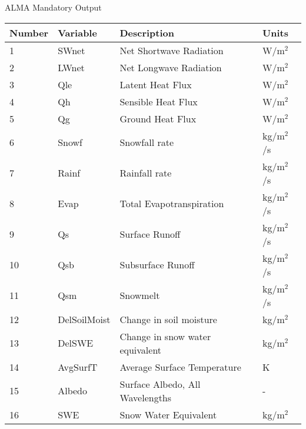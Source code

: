 
\setlength{\extrarowheight}{4pt}

\begin{verbatim}

\end{verbatim}

ALMA Mandatory Output

\begin{tabular}{|l|l|l|l|} \hline \label{table:noah_alma_out}
Number & Variable & Description                     & Units         \\ \hline
1  & SWnet        & Net Shortwave Radiation         & W/m$^2$       \\ \hline
2  & LWnet        & Net Longwave Radiation          & W/m$^2$       \\ \hline
3  & Qle          & Latent Heat Flux                & W/m$^2$       \\ \hline
4  & Qh           & Sensible Heat Flux              & W/m$^2$       \\ \hline
5  & Qg           & Ground Heat Flux                & W/m$^2$       \\ \hline
6  & Snowf        & Snowfall rate                   & kg/m$^2$/s    \\ \hline
7  & Rainf        & Rainfall rate                   & kg/m$^2$/s    \\ \hline
8  & Evap         & Total Evapotranspiration        & kg/m$^2$/s    \\ \hline
9  & Qs           & Surface Runoff                  & kg/m$^2$/s    \\ \hline
10 & Qsb          & Subsurface Runoff               & kg/m$^2$/s    \\ \hline
11 & Qsm          & Snowmelt                        & kg/m$^2$/s    \\ \hline
12 & DelSoilMoist & Change in soil moisture         & kg/m$^2$      \\ \hline
13 & DelSWE       & Change in snow water equivalent & kg/m$^2$      \\ \hline
14 & AvgSurfT     & Average Surface Temperature     & K             \\ \hline
15 & Albedo       & Surface Albedo, All Wavelengths & -             \\ \hline
16 & SWE          & Snow Water Equivalent           & kg/m$^2$      \\ \hline

\end{tabular}

